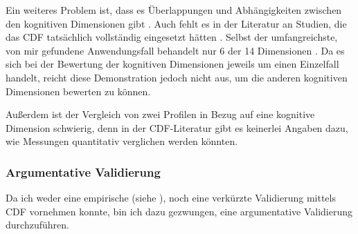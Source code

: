 Ein weiteres Problem ist, dass es Überlappungen und Abhängigkeiten zwischen den kognitiven Dimensionen gibt \citep{carroll2003hci}. Auch fehlt es in der Literatur an Studien, die das CDF tatsächlich vollständig eingesetzt hätten \citep[vgl.][]{carroll2003hci,roast2000formal,GreenCognitive}. Selbst der umfangreichste, von mir gefundene Anwendungsfall behandelt nur 6 der 14 Dimensionen \citep{GreenCognitive}. Da es sich bei der Bewertung der kognitiven Dimensionen jeweils um einen Einzelfall handelt, reicht diese Demonstration jedoch nicht aus, um die anderen kognitiven Dimensionen bewerten zu können.

Außerdem ist der Vergleich von zwei Profilen in Bezug auf eine kognitive Dimension schwierig, denn in der CDF-Literatur gibt es keinerlei Angaben dazu, wie Messungen quantitativ verglichen werden könnten.

\subsubsection{Argumentative Validierung}

Da ich weder eine empirische (siehe ), noch eine verkürzte Validierung mittels CDF vornehmen konnte, bin ich dazu gezwungen, eine argumentative Validierung durchzuführen.

